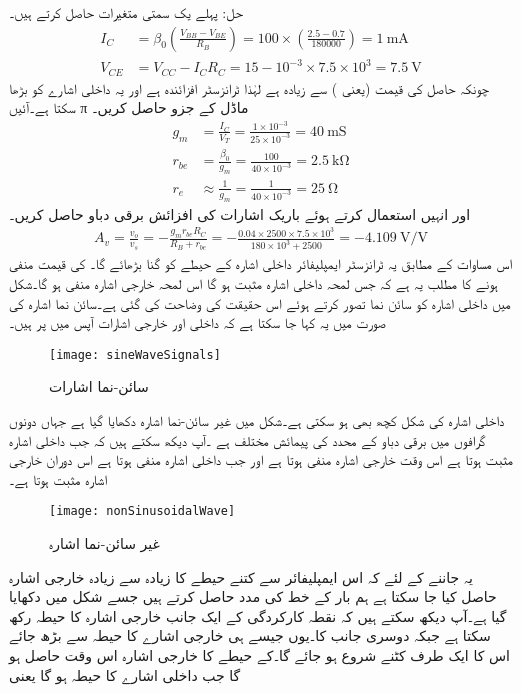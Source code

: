 حل:	پہلے یک سمتی متغیرات حاصل کرتے ہیں۔
\begin{align*}
I_C&=\beta_0 \left(\frac{V_{BB}-V_{BE}}{R_B} \right )=100 \times \left(\frac{2.5-0.7}{180000} \right )=\SI{1}{\milli \ampere}\\
V_{CE}&=V_{CC}-I_C R_C=15-10^{-3} \times 7.5 \times 10^{3}=\SI{7.5}{\volt}
\end{align*}
چونکہ حاصل  کی قیمت   (یعنی ) سے زیادہ ہے لہٰذا ٹرانزسٹر افزائندہ ہے اور یہ داخلی اشارے کو بڑھا سکتا ہے۔آئیں π ماڈل کے جزو حاصل کریں۔
\begin{align*}
g_m &=\frac{I_C}{V_T}=\frac{1 \times 10^{-3}}{25 \times 10^{-3}}=\SI{40}{\milli \siemens}\\
r_{be}&=\frac{\beta_0}{g_m}=\frac{100}{40 \times 10^{-3}}=\SI{2.5}{\kilo \ohm}\\
r_e& \approx \frac{1}{g_m}=\frac{1}{40 \times 10^{-3}}=\SI{25}{\ohm}
\end{align*}
اور انہیں استعمال کرتے ہوئے باریک اشارات کی افزائش برقی دباو  حاصل کریں۔
\begin{align*}
A_v =\frac{v_o}{v_s}=-\frac{g_m r_{be} R_C}{ R_B+r_{be}}=-\frac{0.04 \times 2500 \times 7.5 \times 10^3}{180 \times 10^{3}+2500}=\SI[per=frac,fraction=nice]{-4.109}{\volt \per \volt}
\end{align*}
اس مساوات کے مطابق یہ ٹرانزسٹر ایمپلیفائر داخلی اشارہ  کے حیطے کو  گنا بڑھائے گا۔ کی قیمت منفی ہونے کا مطلب یہ ہے کہ جس لمحہ داخلی اشارہ مثبت ہو گا اس لمحہ خارجی اشارہ منفی ہو گا۔شکل میں داخلی اشارہ کو سائن نما تصور کرتے ہوئے اس حقیقت کی وضاحت کی گئی ہے۔سائن نما اشارہ کی صورت میں یہ کہا جا سکتا ہے کہ داخلی اور خارجی اشارات آپس میں  پر ہیں۔ 
\begin{figure}
\centering
\texttt{[image: sineWaveSignals]}
\caption{سائن-نما اشارات}
\label{شکل_سائن_نما_اشارات}
\end{figure}
داخلی اشارہ کی شکل کچھ بھی ہو سکتی ہے۔شکل   میں غیر سائن-نما اشارہ دکھایا گیا ہے جہاں دونوں گرافوں میں برقی دباو کے محدد کی پیمائش مختلف ہے ۔آپ دیکھ سکتے ہیں کہ جب داخلی اشارہ مثبت ہوتا ہے اس وقت خارجی اشارہ منفی ہوتا ہے اور جب داخلی اشارہ منفی ہوتا ہے اس دوران خارجی اشارہ مثبت ہوتا ہے۔ 
\begin{figure}
\centering
\texttt{[image: nonSinusoidalWave]}
\caption{غیر سائن-نما اشارہ}
\label{شکل_غیر_سائن_نما_اشارہ}
\end{figure}
یہ جاننے کے لئے کہ اس ایمپلیفائر سے کتنے حیطے کا زیادہ سے زیادہ خارجی اشارہ   حاصل کیا جا سکتا ہے ہم بار کے خط کی مدد حاصل کرتے ہیں جسے شکل   میں دکھایا گیا ہے۔آپ دیکھ سکتے ہیں کہ نقطہ کارکردگی کے ایک جانب خارجی اشارہ  کا حیطہ رکھ سکتا ہے جبکہ دوسری جانب  کا۔یوں جیسے ہی خارجی اشارے کا حیطہ  سے بڑھ جائے اس کا ایک طرف کٹنے شروع ہو جائے گا۔کے حیطے کا خارجی اشارہ اس وقت حاصل ہو گا جب داخلی اشارے کا حیطہ   ہو گا یعنی
